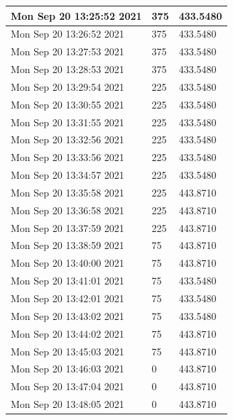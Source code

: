 \begin{longtable}{|l|l|l|}
Mon Sep 20 13:25:52 2021 &                375 &        433.5480 \\ \hline
Mon Sep 20 13:26:52 2021 &                375 &        433.5480 \\ \hline
Mon Sep 20 13:27:53 2021 &                375 &        433.5480 \\ \hline
Mon Sep 20 13:28:53 2021 &                375 &        433.5480 \\ \hline
Mon Sep 20 13:29:54 2021 &                225 &        433.5480 \\ \hline
Mon Sep 20 13:30:55 2021 &                225 &        433.5480 \\ \hline
Mon Sep 20 13:31:55 2021 &                225 &        433.5480 \\ \hline
Mon Sep 20 13:32:56 2021 &                225 &        433.5480 \\ \hline
Mon Sep 20 13:33:56 2021 &                225 &        433.5480 \\ \hline
Mon Sep 20 13:34:57 2021 &                225 &        433.5480 \\ \hline
Mon Sep 20 13:35:58 2021 &                225 &        443.8710 \\ \hline
Mon Sep 20 13:36:58 2021 &                225 &        443.8710 \\ \hline
Mon Sep 20 13:37:59 2021 &                225 &        443.8710 \\ \hline
Mon Sep 20 13:38:59 2021 &                 75 &        443.8710 \\ \hline
Mon Sep 20 13:40:00 2021 &                 75 &        443.8710 \\ \hline
Mon Sep 20 13:41:01 2021 &                 75 &        433.5480 \\ \hline
Mon Sep 20 13:42:01 2021 &                 75 &        433.5480 \\ \hline
Mon Sep 20 13:43:02 2021 &                 75 &        433.5480 \\ \hline
Mon Sep 20 13:44:02 2021 &                 75 &        443.8710 \\ \hline
Mon Sep 20 13:45:03 2021 &                 75 &        443.8710 \\ \hline
Mon Sep 20 13:46:03 2021 &                  0 &        443.8710 \\ \hline
Mon Sep 20 13:47:04 2021 &                  0 &        443.8710 \\ \hline
Mon Sep 20 13:48:05 2021 &                  0 &        443.8710 \\ \hline

\end{longtable}
